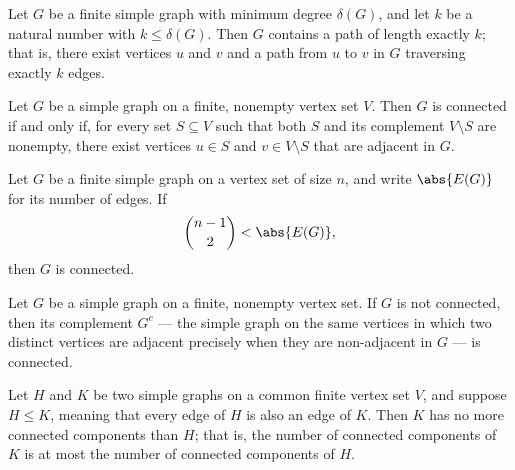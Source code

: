 \begin{theorem}
\label{SimpleGraph.exists_path_length_of_minDegree}
\leanok
Let $G$ be a finite simple graph with minimum degree $\delta(G)$, and let $k$ be a
natural number with $k \le \delta(G)$. Then $G$ contains a path of length exactly $k$;
that is, there exist vertices $u$ and $v$ and a path from $u$ to $v$ in $G$ traversing
exactly $k$ edges.
\end{theorem}

\begin{theorem}
\label{SimpleGraph.connected_iff_forall_partition_edge}
\leanok
Let $G$ be a simple graph on a finite, nonempty vertex set $V$. Then $G$ is connected if
and only if, for every set $S \subseteq V$ such that both $S$ and its complement $V
\setminus S$ are nonempty, there exist vertices $u \in S$ and $v \in V \setminus S$ that
are adjacent in $G$.
\end{theorem}

\begin{theorem}
\label{SimpleGraph.connected_of_edgeCard_gt}
\leanok
Let $G$ be a finite simple graph on a vertex set of size $n$, and write $\abs{E(G)}$ for
its number of edges. If
\[
\binom{n-1}{2} < \abs{E(G)},
\]
then $G$ is connected.
\end{theorem}

\begin{theorem}
\label{SimpleGraph.compl_connected_of_not_connected}
\leanok
Let $G$ be a simple graph on a finite, nonempty vertex set. If $G$ is not connected,
then its complement $G^{c}$ — the simple graph on the same vertices in which two
distinct vertices are adjacent precisely when they are non-adjacent in $G$ — is
connected.
\end{theorem}

\begin{theorem}
\label{SimpleGraph.card_connectedComponent_le_of_le}
\leanok
Let $H$ and $K$ be two simple graphs on a common finite vertex set $V$, and suppose $H
\le K$, meaning that every edge of $H$ is also an edge of $K$. Then $K$ has no more
connected components than $H$; that is, the number of connected components of $K$ is at
most the number of connected components of $H$.
\end{theorem}

